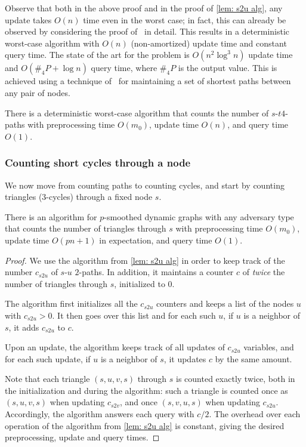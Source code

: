 \documentclass[letter,11pt]{article}
\newcommand{\st}{$s$-$t$\xspace}
\begin{document}
Observe that both in the above proof and in the proof of \cref{lem: s2u alg}, any update takes $O(n)$ time even in the worst case;
in fact, this can already be observed by considering the proof of~\cite{HLS22} in detail.
This results in a deterministic worst-case algorithm with $O(n)$ (non-amortized) update time and constant query time.
The state of the art for the problem is $O(n^2\log^3n)$ update time and $O(\#_4P+\log n)$ query time, where $\#_4P$ is the output value.
This is achieved using a technique of~\cite{DemetrescuI04} for maintaining a set of shortest paths between any pair of nodes.

\begin{corollary}
\label{cor:counting st 4paths worst-case}
	There is a deterministic worst-case algorithm
	that counts the number of \st $4$-paths with preprocessing time $O(m_0)$, 
	update time $O(n)$, 
	and query time $O(1)$.  
\end{corollary}

\subsubsection{Counting short cycles through a node}

We now move from counting paths to counting cycles, and start by counting triangles ($3$-cycles) through a fixed node $s$.


\begin{lemma}
\label{lem:counting s triangles}
	There is an algorithm for $p$-smoothed dynamic graphs 
	with any adversary type
	that counts the number of triangles through $s$ with preprocessing time $O(m_0)$, 
	update time $O(pn+1)$ in expectation, 
	and query time $O(1)$.
\end{lemma}

\begin{proof}
	We use the algorithm from \cref{lem: s2u alg} in order to keep track of the number $c_{s2u}$ of $s$-$u$ $2$-paths.
	In addition, it maintains a counter $c$ of \emph{twice} the number of triangles through $s$, initialized to $0$.

	The algorithm first initializes all the $c_{s2u}$ counters and keeps a list of the nodes $u$ with $c_{s2u}>0$.
	It then goes over this list and for each such $u$, if $u$ is a neighbor of $s$, it adds $c_{s2u}$ to $c$.
	
	Upon an update, the algorithm keeps track of all updates of $c_{s2u}$ variables, and for each such update, if $u$ is a neighbor of $s$, it updates $c$ by the same amount.
	
	Note that each triangle $(s,u,v,s)$ through $s$ is counted exactly twice, both in the initialization and during the algorithm: such a triangle is counted once as $(s,u,v,s)$  when updating $c_{s2v}$, and once $(s,v,u,s)$ when updating $c_{s2u}$.
    Accordingly, the algorithm answers each query with $c/2$.
	The overhead over each operation of the algorithm from \cref{lem: s2u alg}
	is constant, 
    giving the desired preprocessing, update and query times.
\end{proof}
\end{document}

